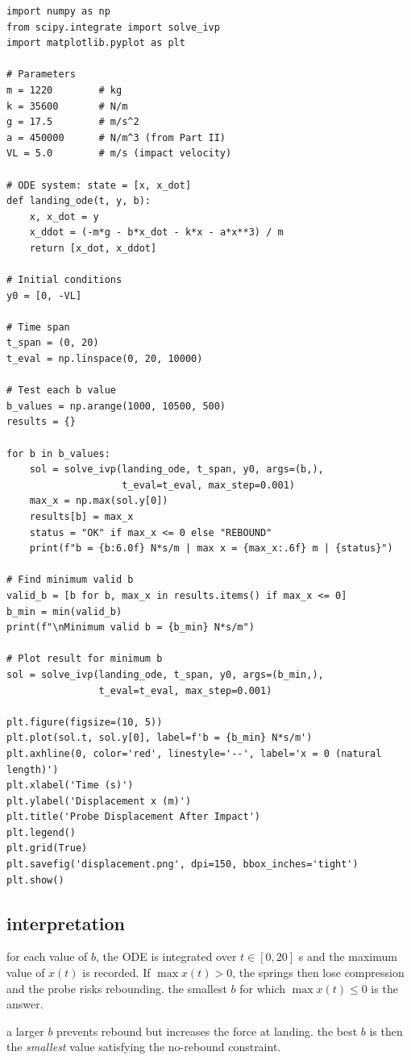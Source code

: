 \documentclass[12pt]{article}
\begin{document}
\begin{lstlisting}[caption={numerical integration to find minimum $b$}]
import numpy as np
from scipy.integrate import solve_ivp
import matplotlib.pyplot as plt

# Parameters
m = 1220        # kg
k = 35600       # N/m
g = 17.5        # m/s^2
a = 450000      # N/m^3 (from Part II)
VL = 5.0        # m/s (impact velocity)

# ODE system: state = [x, x_dot]
def landing_ode(t, y, b):
    x, x_dot = y
    x_ddot = (-m*g - b*x_dot - k*x - a*x**3) / m
    return [x_dot, x_ddot]

# Initial conditions
y0 = [0, -VL]

# Time span
t_span = (0, 20)
t_eval = np.linspace(0, 20, 10000)

# Test each b value
b_values = np.arange(1000, 10500, 500)
results = {}

for b in b_values:
    sol = solve_ivp(landing_ode, t_span, y0, args=(b,),
                    t_eval=t_eval, max_step=0.001)
    max_x = np.max(sol.y[0])
    results[b] = max_x
    status = "OK" if max_x <= 0 else "REBOUND"
    print(f"b = {b:6.0f} N*s/m | max x = {max_x:.6f} m | {status}")

# Find minimum valid b
valid_b = [b for b, max_x in results.items() if max_x <= 0]
b_min = min(valid_b)
print(f"\nMinimum valid b = {b_min} N*s/m")

# Plot result for minimum b
sol = solve_ivp(landing_ode, t_span, y0, args=(b_min,),
                t_eval=t_eval, max_step=0.001)

plt.figure(figsize=(10, 5))
plt.plot(sol.t, sol.y[0], label=f'b = {b_min} N*s/m')
plt.axhline(0, color='red', linestyle='--', label='x = 0 (natural length)')
plt.xlabel('Time (s)')
plt.ylabel('Displacement x (m)')
plt.title('Probe Displacement After Impact')
plt.legend()
plt.grid(True)
plt.savefig('displacement.png', dpi=150, bbox_inches='tight')
plt.show()
\end{lstlisting}

\subsection{interpretation}

for each value of $b$, the ODE is integrated over $t \in [0, 20]$ s and the maximum value of $x(t)$ is recorded. If $\max x(t) > 0$, the springs then lose compression and the probe risks rebounding. the smallest $b$ for which $\max x(t) \leq 0$ is the answer.

a larger $b$ prevents rebound but increases the force at landing. the best $b$ is then the \textit{smallest} value satisfying the no-rebound constraint.
\end{document}
